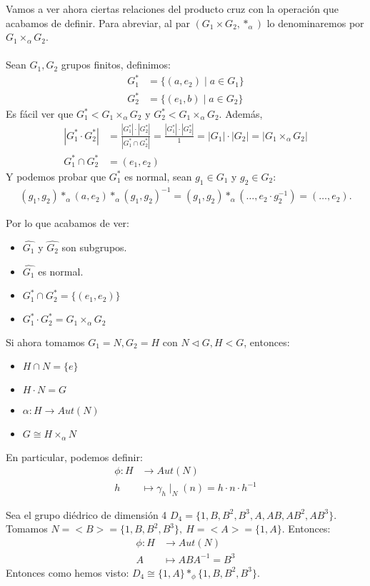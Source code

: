 Vamos a ver ahora ciertas relaciones del producto cruz con la operación que acabamos de definir. Para abreviar, al par $(G_1 \times G_2, \ast_\alpha)$ lo denominaremos por $G_1 \times_\alpha G_2$.\\\\
Sean $G_1, G_2$ grupos finitos, definimos:
\begin{align*}
	G_1^\ast &= \{(a, e_2) \mid a \in G_1\}\\
	G_2^\ast &= \{(e_1, b) \mid a \in G_2\}
\end{align*}
Es fácil ver que $G_1^\ast < G_1 \times_\alpha G_2$ y $G_2^\ast < G_1 \times_\alpha G_2$. Además,
\begin{align*}
	|G_1^\ast\cdot G_2^\ast| &= \frac{|G_1^\ast|\cdot |G_2^\ast|}{|G_1^\ast \cap G_2^\ast|} = \frac{|G_1^\ast|\cdot |G_2^\ast|}{1} = |G_1|\cdot |G_2| = |G_1 \times_\alpha G_2|\\
	G_1^\ast \cap G_2^\ast &= {(e_1, e_2)}
\end{align*}
Y podemos probar que $G_1^\ast$ es normal, sean $g_1 \in G_1$ y $g_2 \in G_2$:
\begin{align*}
	(g_1, g_2) \ast_\alpha (a, e_2) \ast_\alpha (g_1, g_2)^{-1} = (g_1,g_2)\ast_\alpha(\ldots, e_2\cdot g_2^{-1}) = (\ldots, e_2).
\end{align*}
\begin{cor}
	\label{cor:propiedadesgrupdirecto}
	Por lo que acabamos de ver:
	\begin{itemize}
		\item $\hat{G_1}$ y $\hat{G_2}$ son subgrupos.
		\item $\hat{G_1}$ es normal.
		\item $G_1^\ast \cap G_2^\ast = \{(e_1,e_2)\}$
		\item $G_1^\ast \cdot G_2^\ast = G_1 \times_\alpha G_2$
	\end{itemize}
	Si ahora tomamos $G_1 = N, G_2 = H$ con $N \triangleleft G, H < G$, entonces:
	\begin{itemize}
		\item $H \cap N = \{e\}$
		\item $H \cdot N = G$
		\item $\alpha: H \longrightarrow Aut(N)$
		\item $G \cong H \times_\alpha N$
	\end{itemize}
\end{cor}
En particular, podemos definir:
\begin{align*}
	\phi : H &\longrightarrow Aut(N)\\
	h &\longmapsto \gamma_h\mid_N(n) = h\cdot n\cdot h^{-1}
\end{align*}
\begin{ej}
	Sea el grupo diédrico de dimensión 4 $D_4 = \{1,B,B^2,B^3,A,AB,AB^2,AB^3\}$. Tomamos $N = <B> =\{1,B,B^2,B^3\},\ H=<A>=\{1,A\}$. Entonces:
	\begin{align*}
		\phi: H &\longrightarrow Aut(N)\\
		A &\longmapsto ABA^{-1} = B^3
	\end{align*}
Entonces como hemos visto: $D_4 \cong \{1,A\} \ast_\phi \{1,B,B^2,B^3\}$.
\end{ej}
